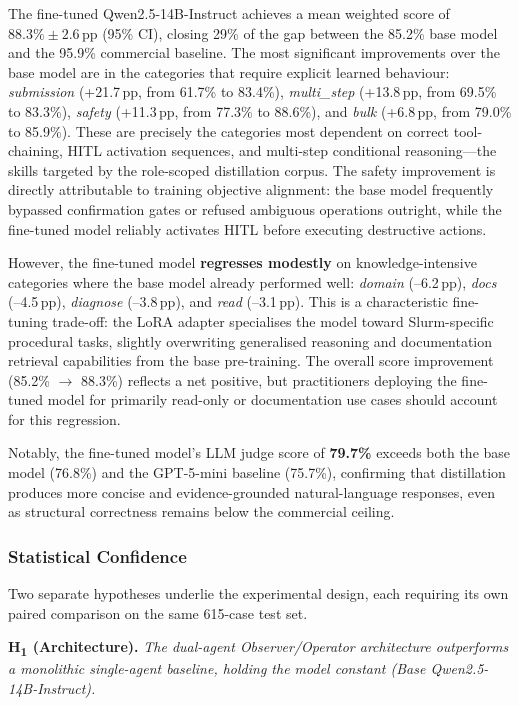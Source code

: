 The fine-tuned Qwen2.5-14B-Instruct achieves a mean weighted score of $\mathbf{88.3\% \pm 2.6}$\,pp (95\% CI), closing 29\% of the gap between the 85.2\% base model and the 95.9\% commercial baseline. The most significant improvements over the base model are in the categories that require explicit learned behaviour: \textit{submission} (+21.7\,pp, from 61.7\% to 83.4\%), \textit{multi\_step} (+13.8\,pp, from 69.5\% to 83.3\%), \textit{safety} (+11.3\,pp, from 77.3\% to 88.6\%), and \textit{bulk} (+6.8\,pp, from 79.0\% to 85.9\%). These are precisely the categories most dependent on correct tool-chaining, HITL activation sequences, and multi-step conditional reasoning---the skills targeted by the role-scoped distillation corpus. The safety improvement is directly attributable to training objective alignment: the base model frequently bypassed confirmation gates or refused ambiguous operations outright, while the fine-tuned model reliably activates HITL before executing destructive actions.

However, the fine-tuned model \textbf{regresses modestly} on knowledge-intensive categories where the base model already performed well: \textit{domain} (--6.2\,pp), \textit{docs} (--4.5\,pp), \textit{diagnose} (--3.8\,pp), and \textit{read} (--3.1\,pp). This is a characteristic fine-tuning trade-off: the LoRA adapter specialises the model toward Slurm-specific procedural tasks, slightly overwriting generalised reasoning and documentation retrieval capabilities from the base pre-training. The overall score improvement (85.2\% $\to$ 88.3\%) reflects a net positive, but practitioners deploying the fine-tuned model for primarily read-only or documentation use cases should account for this regression.

Notably, the fine-tuned model's LLM judge score of \textbf{79.7\%} exceeds both the base model (76.8\%) and the GPT-5-mini baseline (75.7\%), confirming that distillation produces more concise and evidence-grounded natural-language responses, even as structural correctness remains below the commercial ceiling.

\subsubsection{Statistical Confidence}
\label{sec:stat-confidence}

Two separate hypotheses underlie the experimental design, each requiring its own paired comparison on the same 615-case test set.

\medskip
\noindent\textbf{H\textsubscript{1} (Architecture).} \textit{The dual-agent Observer/Operator architecture outperforms a monolithic single-agent baseline, holding the model constant (Base Qwen2.5-14B-Instruct).}

